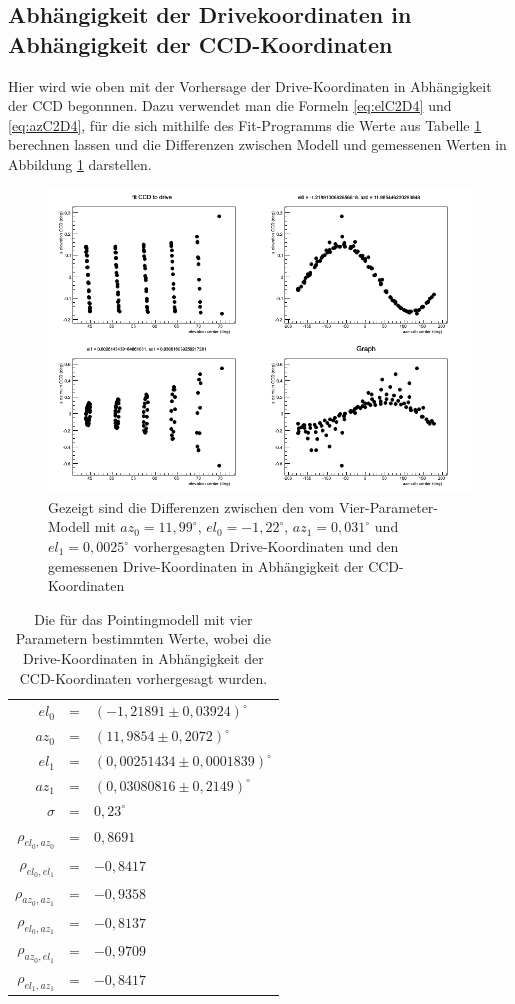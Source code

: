 \subsection{Abhängigkeit der Drivekoordinaten in Abhängigkeit der CCD-Koordinaten}
Hier wird wie oben mit der Vorhersage der Drive-Koordinaten in Abhängigkeit der CCD begonnnen. Dazu verwendet man die Formeln \ref{eq:elC2D4} und \ref{eq:azC2D4}, für die sich mithilfe des Fit-Programms die Werte aus Tabelle \ref{tab:C2D4} berechnen lassen und die Differenzen zwischen Modell und gemessenen Werten in Abbildung \ref{img:C2D4} darstellen.
\begin{figure}[htbp]
\centering
\includegraphics[width=\textwidth]{../341/run341C2D_4par.png}
\caption{Gezeigt sind die Differenzen zwischen den vom Vier-Parameter-Modell mit $az_0=11,99^{\circ}$, $el_0=-1,22^{\circ}$, $az_1=0,031^{\circ}$ und $el_1=0,0025^{\circ}$ vorhergesagten Drive-Koordinaten und den gemessenen Drive-Koordinaten in Abhängigkeit der CCD-Koordinaten}
\label{img:C2D4}
\end{figure}
\begin{table}[htbp]
\centering
\begin{tabular}{rcl}
\toprule
$el_0$ &=& $(-1,21891\pm 0,03924)^{\circ}$\\
$az_0$ &=& $(11,9854\pm0,2072)^{\circ}$\\
$el_1$ &=& $(0,00251434\pm 0,0001839)^{\circ}$\\
$az_1$ &=& $(0,03080816\pm0,2149)^{\circ}$\\
$\sigma$ &=& $0,23^{\circ}$\\
$\rho_{el_0,az_0}$ &=& $0,8691$\\
$\rho_{el_0,el_1}$ &=& $-0,8417$\\
$\rho_{az_0,az_1}$ &=& $-0,9358$\\
$\rho_{el_0,az_1}$ &=& $-0,8137$\\
$\rho_{az_0,el_1}$ &=& $-0,9709$\\
$\rho_{el_1,az_1}$ &=& $-0,8417$\\
\bottomrule
\end{tabular}
\label{tab:C2D4}
\caption{Die für das Pointingmodell mit vier Parametern bestimmten Werte, wobei die Drive-Koordinaten in Abhängigkeit der CCD-Koordinaten vorhergesagt wurden.}
\end{table}


